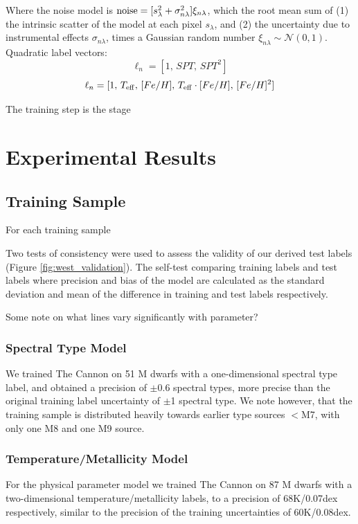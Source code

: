 \documentclass[modern]{aastex62}
\begin{document}
Where the noise model is ${\rm noise}=[s_{\lambda}^2 + \sigma_{n\lambda}^2]\xi_{n\lambda}$, which the root mean sum of (1) the intrinsic scatter of the model at each pixel \emph{$s_{\lambda}$}, and (2) the uncertainty due to instrumental effects \emph{$\sigma_{n\lambda}$}, times a Gaussian random number $\xi_{n\lambda} \sim \mathcal{N} (0,1)$. Quadratic label vectors:
	\[\ell_{n} = [1, \, SPT, \, SPT^{2}] \]
	\[\ell_{n} = [1, \, T_{\rm eff}, \, [Fe/H], \, T_{\rm eff} \cdot [Fe/H], \, [Fe/H]^{2}] \]

The training step is the stage 


\section{Experimental Results} \label{sec:results}

\subsection{Training Sample}

For each training sample 

Two tests of consistency were used to assess the validity of our derived test labels (Figure \ref{fig:west_validation}). The self-test comparing training labels and test labels where precision and bias of the model are calculated as the standard deviation and mean of the difference in training and test labels respectively. 

Some note on what lines vary significantly with parameter?

\subsubsection{Spectral Type Model}
We trained The Cannon on 51 M dwarfs with a one-dimensional spectral type label, and obtained a precision of $\pm$0.6 spectral types, more precise than the original training label uncertainty of $\pm$1 spectral type. We note however, that the training sample is distributed heavily towards earlier type sources $<$M7, with only one M8 and one M9 source.

\subsubsection{Temperature/Metallicity Model}
For the physical parameter model we trained The Cannon on 87 M dwarfs with a two-dimensional temperature/metallicity labels, to a precision of 68K/0.07dex respectively, similar to the precision of the training uncertainties of 60K/0.08dex.
\end{document}
